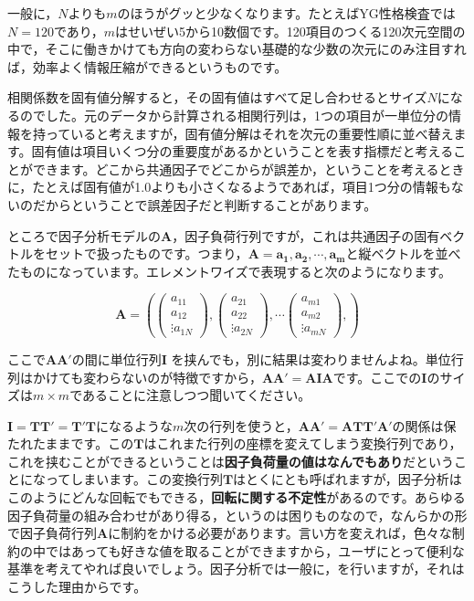 \documentclass{ltjsbook}
\begin{document}
一般に，$N$よりも$m$のほうがグッと少なくなります。たとえばYG性格検査では$N=120$であり，$m$はせいぜい5から10数個です。120項目のつくる120次元空間の中で，そこに働きかけても方向の変わらない基礎的な少数の次元にのみ注目すれば，効率よく情報圧縮ができるというものです。

相関係数を固有値分解すると，その固有値はすべて足し合わせるとサイズ$N$になるのでした。元のデータから計算される相関行列は，1つの項目が一単位分の情報を持っていると考えますが，固有値分解はそれを次元の重要性順に並べ替えます。固有値は項目いくつ分の重要度があるかということを表す指標だと考えることができます。どこから共通因子でどこからが誤差か，ということを考えるときに，たとえば固有値が1.0よりも小さくなるようであれば，項目1つ分の情報もないのだからということで誤差因子だと判断することがあります。

ところで因子分析モデルの$\bm{A}$，因子負荷行列ですが，これは共通因子の固有ベクトルをセットで扱ったものです。つまり，$\bm{A} = \bm{a_1,a_2,\cdots,a_m}$と縦ベクトルを並べたものになっています。エレメントワイズで表現すると次のようになります。

\[
    \bm{A} = \left (
    \begin{pmatrix}  a_{11}\\a_{12}\\\vdots a_{1N} \end{pmatrix},
    \begin{pmatrix}  a_{21}\\a_{22}\\\vdots a_{2N} \end{pmatrix},
    \cdots
    \begin{pmatrix}  a_{m1}\\a_{m2}\\\vdots a_{mN} \end{pmatrix},
    \right )
\]

ここで$\bm{AA'}$の間に単位行列$\bm{I}$ を挟んでも，別に結果は変わりませんよね。単位行列はかけても変わらないのが特徴ですから，$\bm{AA'}=\bm{AIA}$です。ここでの$\bm{I}$のサイズは$m \times m$であることに注意しつつ聞いてください。

$\bm{I} = \bm{TT'}=\bm{T'T}$になるような$m$次の行列を使うと，$\bm{AA'} = \bm{ATT'A'}$の関係は保たれたままです。この$\bm{T}$はこれまた行列の座標を変えてしまう変換行列であり，これを挟むことができるということは\textbf{因子負荷量の値はなんでもあり}だということになってしまいます。この変換行列$\bm{T}$はとくにとも呼ばれますが，因子分析はこのようにどんな回転でもできる，\textbf{回転に関する不定性}があるのです。あらゆる因子負荷量の組み合わせがあり得る，というのは困りものなので，なんらかの形で因子負荷行列$\bm{A}$に制約をかける必要があります。言い方を変えれば，色々な制約の中ではあっても好きな値を取ることができますから，ユーザにとって便利な基準を考えてやれば良いでしょう。因子分析では一般に，を行いますが，それはこうした理由からです。
\end{document}
